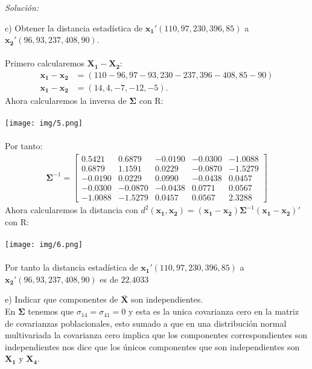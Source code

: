 \documentclass[12pt]{article}
\newenvironment{sol}
    {\emph{Solución:}
    }
    {
    }
\begin{document}
\begin{sol}
c) Obtener la distancia estadística de $\mathbf{x_1}'(110, 97, 230, 396, 85)$ a $\mathbf{x_2}'(96, 93, 237, 408, 90)$. \\\\
Primero calcularemos  \(\mathbf{X_1} - \mathbf{X_2}\):
\begin{align*}
\mathbf{x_1} - \mathbf{x_2} &= (110 - 96, 97 - 93, 230 - 237, 396 - 408, 85 - 90) \\
\mathbf{x_1} - \mathbf{x_2}&= (14, 4, -7, -12, -5).
\end{align*}
Ahora calcularemos la inversa de $\mathbf{\Sigma}$ con R: \\\\
\texttt{[image: img/5.png]}\\\\
Por tanto:
\begin{align*}
\mathbf{\Sigma}^{-1} = \begin{bmatrix}
  0.5421 &  0.6879 & -0.0190 & -0.0300 & -1.0088 \\
  0.6879 &  1.1591 &  0.0229 & -0.0870 & -1.5279 \\
 -0.0190 &  0.0229 &  0.0990 & -0.0438 &  0.0457 \\
 -0.0300 & -0.0870 & -0.0438 &  0.0771 &  0.0567 \\
 -1.0088 & -1.5279 &  0.0457 &  0.0567 &  2.3288
\end{bmatrix}
\end{align*}
Ahora calcularemos la distancia con $d^2(\mathbf{x_1,x_2})=(\mathbf{x_1-x_2})\mathbf{\Sigma}^{-1}(\mathbf{x_1-x_2})'$ con R:\\\\
\texttt{[image: img/6.png]}\\\\
Por tanto la distancia estadística de $\mathbf{x_1}'(110, 97, 230, 396, 85)$ a $\mathbf{x_2}'(96, 93, 237, 408, 90)$ es de $22.4033$ 

\pagebreak

e) Indicar que componentes de $\mathbf{\bar{X}}$ son independientes.\\ 
En $\mathbf{\Sigma}$ tenemos que $\sigma_{14} = \sigma_{41} = 0$ y esta es la unica covarianza cero en la matriz de covarianzas poblacionales, esto sumado a que en una distribución normal multivariada la covarianza cero implica que los componentes correspondientes son independientes nos dice que los únicos componentes que son independientes son $\mathbf{X_1}$ y $\mathbf{X_4}$.
\end{sol}



\end{document}
